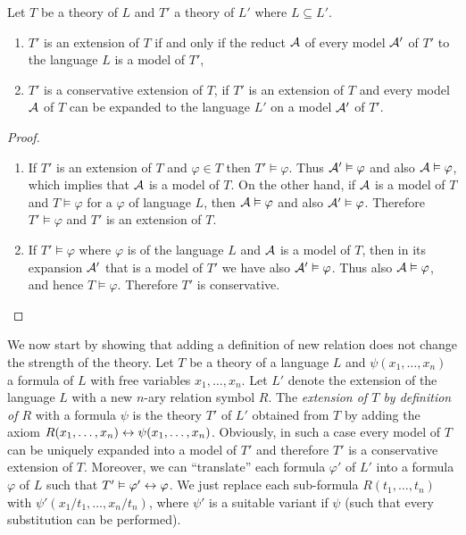 \begin{lemma}
Let $T$ be a theory of $L$ and $T'$ a theory of $L'$ where $L \subseteq L'$.
\begin{enumerate}
	\item $T'$ is an extension of $T$ if and only if the reduct $\mathcal{A}$ of every model $\mathcal{A}'$ of $T'$ to the language $L$ is a model of $T'$,
	\item $T'$ is a conservative extension of $T$, if $T'$ is an extension of $T$ and every model $\mathcal{A}$ of $T$ can be expanded to the language $L'$ on a model $\mathcal{A}'$ of $T'$.
\end{enumerate}
\end{lemma}
\begin{proof}
\begin{enumerate}
  \item If $T'$ is an extension of $T$ and $\varphi \in T$ then $T' \vDash \varphi$. Thus $\mathcal{A}' \vDash \varphi$ and also $\mathcal{A} \vDash \varphi$, which implies that $\mathcal{A}$ is a model of $T$. On the other hand, if $\mathcal{A}$ is a model of $T$ and $T \vDash \varphi$ for a $\varphi$ of language $L$, then $\mathcal{A} \vDash \varphi$ and also $\mathcal{A}' \vDash \varphi$. Therefore $T' \vDash \varphi$ and $T'$ is an extension of $T$.
  \item If $T' \vDash \varphi$ where $\varphi$ is of the language $L$ and $\mathcal{A}$ is a model of $T$, then in its expansion $\mathcal{A}'$ that is a model of $T'$ we have also $\mathcal{A}' \vDash \varphi$. Thus also $\mathcal{A} \vDash \varphi$, and hence $T \vDash \varphi$. Therefore $T'$ is conservative.
\end{enumerate}
\vspace{-\baselineskip}
\end{proof}

We now start by showing that adding a definition of new relation does not change the strength of the theory. Let $T$ be a theory of a language $L$ and $\psi(x_1, \dots, x_n)$ a formula of $L$ with free variables $x_1, \dots, x_n$. Let $L'$ denote the extension of the language $L$ with a new $n$-ary relation symbol $R$. The \emph{extension of $T$ by definition of $R$} with a formula $\psi$ is the theory $T'$ of $L'$ obtained from $T$ by adding the axiom $R(x_1, \dots, x_n) \leftrightarrow \psi(x_1, \dots, x_n)$. Obviously, in such a case every model of $T$ can be uniquely expanded into a model of $T'$ and therefore $T'$ is a conservative extension of $T$. Moreover, we can ``translate'' each formula $\varphi'$ of $L'$ into a formula $\varphi$ of $L$ such that $T' \vDash \varphi' \leftrightarrow \varphi$. We just replace each sub-formula $R(t_1, \dots, t_n)$ with $\psi'(x_1/t_1, \dots, x_n/t_n)$, where $\psi'$ is a suitable variant if $\psi$ (such that every substitution can be performed).

